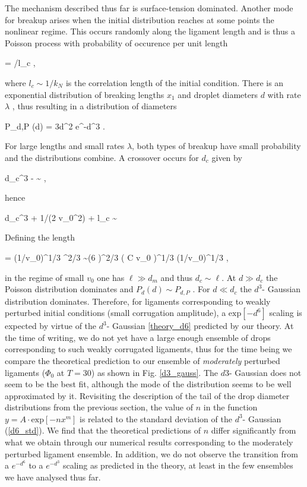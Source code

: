The mechanism described thus far is surface-tension dominated. 
Another mode for breakup arises when the initial distribution reaches 
at some points the nonlinear regime. This occurs randomly along
the ligament length and is thus a Poisson process with probability of 
occurence per unit length

\be
\lambda = \exp[{-1/(2 v_0^2)}]/l_c \label{p3} , 
\nd

where $l_c \sim 1/k_N$ is the correlation length of the initial condition. There is an exponential distribution
of breaking lengths $x_1$ and droplet diameters $d$ with rate $\lambda$ , thus resulting in a distribution of diameters

\be
  P_{d,P} (d) = {3d^2} \lambda e^{-\lambda d^3} \label{PP} .
\nd

For large lengths and small rates $\lambda$, both types of breakup have small probability and the distributions
  combine. A crossover occurs for $d_c$ given by

\be
  {\lambda d_c^3} - \ln \lambda  \sim {} , 
\nd

hence

\be
  {\lambda d_c^3} + 1/(2 v_0^2) + \ln l_c \sim {} 
\nd 

Defining the length

\be
  \ell = (1/v_0)^{1/3} \sigma^{2/3} \sim   (6  \pi)^{2/3} \left(  {C \ln v_0} \right)^{1/3}  (1/v_0)^{1/3} , 
\nd

in the regime of small $v_0$ one has $\ell \gg d_m$ and thus $d_c \sim \ell$. At $d \gg d_c$ the Poisson distribution
dominates and $P_d(d) \sim P_{d,P}$ . 
For $d \ll d_c$ the $d^3$- Gaussian distribution dominates. 
Therefore, for ligaments corresponding to weakly perturbed initial 
conditions (small corrugation amplitude), a $\textrm{exp}[-d^6]$ 
scaling is expected by virtue of the $d^3$- Gaussian \eqref{theory_d6} predicted by our theory.   
At the time of writing, we do not yet have a large enough ensemble of drops
corresponding to such weakly corrugated ligaments, thus for the time being 
we compare the theoretical prediction to our ensemble of \textit{moderately} 
perturbed ligaments ($\Phi_0$ at $T=30$) as shown in Fig. \ref{d3_gauss}.
The $d3$- Gaussian does not seem to be the best fit, although  
the mode of the distribution seems to be well approximated by it. 
Revisiting the description of the tail of the drop diameter distributions from 
the previous section, the value of $n$ in the function $y = A\cdot \textrm{exp}[-nx^m]$
is related to the standard deviation of the $d^3$- Gaussian (\eqref{d6_std}). 
We find that the theoretical predictions of $n$ differ significantly 
from what we obtain through our numerical results corresponding to the moderately perturbed ligament ensemble. 
In addition, we do not observe the transition from a $e^{-d^6}$ to a $e^{-d^3}$ scaling 
as predicted in the theory, at least in the few ensembles we have analysed thus far. 

